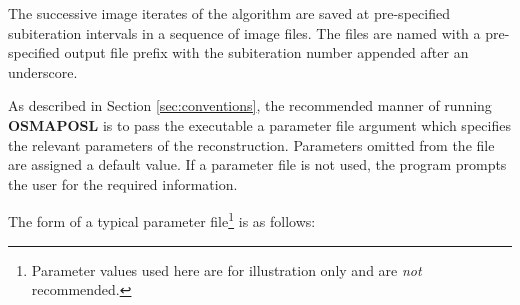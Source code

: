 \documentclass{article}
\begin{document}
The successive image iterates of the algorithm are saved at pre-specified 
subiteration intervals in a sequence of image files. The files 
are named with a pre-specified output file prefix with the subiteration 
number appended after an underscore.


As described in Section \ref{sec:conventions}, 
the recommended manner of running \textbf{OSMAPOSL} 
is to pass the executable a parameter file argument which specifies 
the relevant parameters of the reconstruction. Parameters omitted 
from the file are assigned a default value. If a parameter file 
is not used, the program prompts the user for the required information. 



The form of a typical parameter file\footnote{Parameter values used here are for
illustration only and are \textit{not} recommended.} is as follows:
\end{document}
